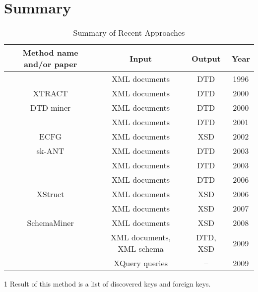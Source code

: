 \section{Summary}
\begin{table}
  \begin{threeparttable}
  \footnotesize \begin{tabular}{|c|c|c|c|}
    \hline
    Method name and/or paper & Input & Output & Year \\ \hline \hline
    \cite{Ahonen1996GeneratingGrammars} & XML documents & DTD & 1996 \\ \hline
    XTRACT \cite{Garofalakis:2000:XSE:342009.335409} & XML documents & DTD & 2000 \\ \hline
    DTD-miner \cite{Moh:2000:RSW:336597.336638} & XML documents & DTD & 2000 \\ \hline
    \cite{Fernau:2001:LXG:645744.667236} & XML documents & DTD & 2001 \\ \hline
    ECFG \cite{Chidlovskii:2002:SEX:544220.544288} & XML documents & XSD & 2002 \\ \hline
    sk-ANT \cite{Wong03onstructural} & XML documents & DTD & 2003 \\ \hline
    \cite {Min:2003:EES:639473.639475} & XML documents & DTD & 2003 \\ \hline
    \cite{Bex:2006:ICD:1182635.1164139} & XML documents & DTD & 2006 \\ \hline
    XStruct \cite {Hegewald:2006:XES:1129755.1130124} & XML documents & XSD & 2006 \\ \hline
    \cite{Bex:2007:IXS:1325851.1325964} & XML documents & XSD & 2007 \\ \hline
    SchemaMiner \cite{Vosta:2008:EAC:1802514.1802522} & XML documents & XSD & 2008 \\ \hline
    \cite{Mlynkova:2009:IXS:1862681.1862693} & XML documents, XML schema & DTD, XSD & 2009 \\ \hline
    \cite{Necasky:2009:DXK:1529282.1529414} & XQuery queries & --\tnote{1} & 2009 \\ \hline    
  \end{tabular}
  \begin{tablenotes}
	\item [1] Result of this method is a list of discovered keys and foreign keys.
  \end{tablenotes}
  \caption{Summary of Recent Approaches}
  \label{table_summary_of_recent_approaches}
  \end{threeparttable}
\end{table}

